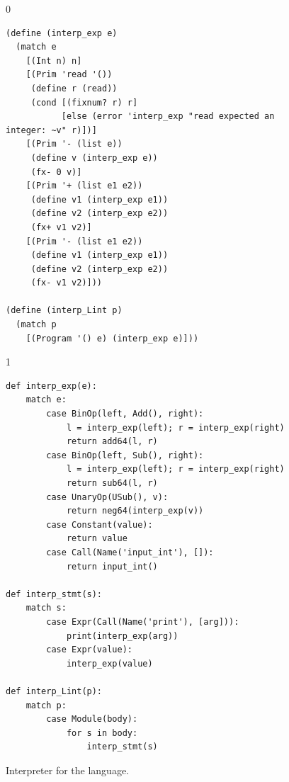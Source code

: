 \documentclass[7x10]{TimesAPriori_MIT}%
\def\racketEd{0}
\def\pythonEd{1}
\providecommand{\BookEdition}{1}
\let\edition\BookEdition
\newcommand{\pythonColor}[0]{}
\numberwithin{theorem}{chapter}
\numberwithin{definition}{chapter}
\numberwithin{equation}{chapter}
\begin{document}
\begin{figure}[tp]
\begin{tcolorbox}[colback=white]
{\if\edition\racketEd
\begin{lstlisting}
(define (interp_exp e)
  (match e
    [(Int n) n]
    [(Prim 'read '())
     (define r (read))
     (cond [(fixnum? r) r]
           [else (error 'interp_exp "read expected an integer: ~v" r)])]
    [(Prim '- (list e))
     (define v (interp_exp e))
     (fx- 0 v)]
    [(Prim '+ (list e1 e2))
     (define v1 (interp_exp e1))
     (define v2 (interp_exp e2))
     (fx+ v1 v2)]
    [(Prim '- (list e1 e2))
     (define v1 (interp_exp e1))
     (define v2 (interp_exp e2))
     (fx- v1 v2)]))

(define (interp_Lint p)
  (match p
    [(Program '() e) (interp_exp e)]))
\end{lstlisting}
\fi}
{\if\edition\pythonEd\pythonColor
\begin{lstlisting}
def interp_exp(e):
    match e:
        case BinOp(left, Add(), right):
            l = interp_exp(left); r = interp_exp(right)
            return add64(l, r)
        case BinOp(left, Sub(), right):
            l = interp_exp(left); r = interp_exp(right)
            return sub64(l, r)
        case UnaryOp(USub(), v):
            return neg64(interp_exp(v))
        case Constant(value):
            return value
        case Call(Name('input_int'), []):
            return input_int()

def interp_stmt(s):
    match s:
        case Expr(Call(Name('print'), [arg])):
            print(interp_exp(arg))
        case Expr(value):
            interp_exp(value)

def interp_Lint(p):
    match p:
        case Module(body):
            for s in body:
                interp_stmt(s)
\end{lstlisting}
\fi}
\end{tcolorbox}

\caption{Interpreter for the \LangInt{} language.}
\label{fig:interp_Lint}
\end{figure}
\end{document}
